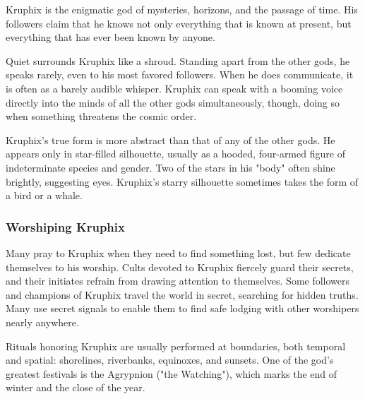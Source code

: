     Kruphix is the enigmatic god of mysteries, horizons, and the passage of time. His followers claim that he knows not only everything that is known at present, but everything that has ever been known by anyone.

    Quiet surrounds Kruphix like a shroud. Standing apart from the other gods, he speaks rarely, even to his most favored followers. When he does communicate, it is often as a barely audible whisper. Kruphix can speak with a booming voice directly into the minds of all the other gods simultaneously, though, doing so when something threatens the cosmic order.

    Kruphix's true form is more abstract than that of any of the other gods. He appears only in star-filled silhouette, usually as a hooded, four-armed figure of indeterminate species and gender. Two of the stars in his "body" often shine brightly, suggesting eyes. Kruphix's starry silhouette sometimes takes the form of a bird or a whale.

    \subsubsection{Worshiping Kruphix}
        Many pray to Kruphix when they need to find something lost, but few dedicate themselves to his worship. Cults devoted to Kruphix fiercely guard their secrets, and their initiates refrain from drawing attention to themselves. Some followers and champions of Kruphix travel the world in secret, searching for hidden truths. Many use secret signals to enable them to find safe lodging with other worshipers nearly anywhere.

        Rituals honoring Kruphix are usually performed at boundaries, both temporal and spatial: shorelines, riverbanks, equinoxes, and sunsets. One of the god's greatest festivals is the Agrypnion ("the Watching"), which marks the end of winter and the close of the year.
